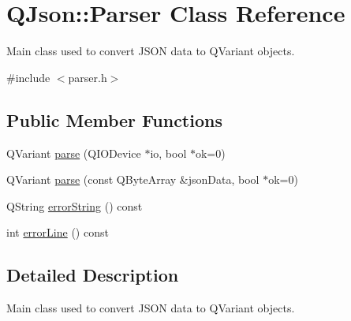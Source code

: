 \hypertarget{class_q_json_1_1_parser}{
\section{\-Q\-Json\-:\-:\-Parser \-Class \-Reference}
\label{class_q_json_1_1_parser}
}


\-Main class used to convert \-J\-S\-O\-N data to \-Q\-Variant objects.  




{\ttfamily \#include $<$parser.\-h$>$}

\subsection*{\-Public \-Member \-Functions}
\begin{DoxyCompactItemize}
\item 
\-Q\-Variant \hyperlink{class_q_json_1_1_parser_adb038b715846ec9615e4e31a36e9b1b6}{parse} (\-Q\-I\-O\-Device $\ast$io, bool $\ast$ok=0)
\item 
\-Q\-Variant \hyperlink{class_q_json_1_1_parser_aa85e5deb9e8661e3f6bdbd7dbfc78458}{parse} (const \-Q\-Byte\-Array \&json\-Data, bool $\ast$ok=0)
\item 
\-Q\-String \hyperlink{class_q_json_1_1_parser_abb41775f9a7b85cb41274d9537b16bf7}{error\-String} () const 
\item 
int \hyperlink{class_q_json_1_1_parser_a737f5f802407638d4927cdffa1304a38}{error\-Line} () const 
\end{DoxyCompactItemize}


\subsection{\-Detailed \-Description}
\-Main class used to convert \-J\-S\-O\-N data to \-Q\-Variant objects. 

